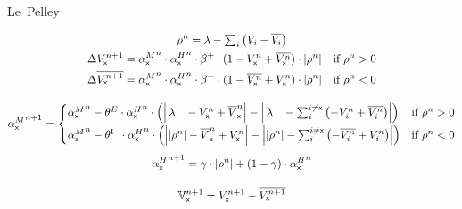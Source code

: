 \documentclass[border=10pt,varwidth=14cm]{standalone}
\begin{document}
\newcommand{\eks}{\textsf{x}}
\newcommand{\longlambda}{\rlap{$\,\lambda$}\phantom{\left| \rho^n \right|}}
\newcommand{\longI}{\rlap{\textsuperscript{I}}\phantom{E}}
\newcommand{\VNet}{\mathbb{V}}

\begin{center}
	\huge
	\sffamily
	Le~Pelley
\end{center}
\begin{gather*}
	\begin{gathered}
		\rho^n = \lambda - \textstyle\sum_i \left( V_i - \overline{V_i} \right) \\
		\begin{aligned}
			\Delta V_\eks^{n + 1} &= {\alpha^M_\eks}^n \cdot {\alpha^H_\eks}^n \cdot \beta^+ \cdot (1 - V_\eks^n + \overline{V_\eks^n}) \cdot \left| \rho^n \right| & \text{if } \rho^n > 0 \\
			 \Delta \overline{V_\eks^{n + 1}} &= {\alpha^M_\eks}^n \cdot {\alpha^H_\eks}^n \cdot \beta^- \cdot (1 - \overline{V_\eks^n} + V_\eks^n) \cdot \left| \rho^n \right| & \text{if } \rho^n < 0
		\end{aligned}
	\end{gathered} \\[1em]
	\begin{gathered}
		{\alpha^M_\eks}^{n + 1} =
			\begin{cases}
				{\alpha^M_\eks}^n - \theta^E \cdot {\alpha^H_\eks}^n \cdot \left( \left| \longlambda - V_\eks^n + \overline{V}_\eks^n \right| - \left| \longlambda - \textstyle\sum_i^{i \neq \eks} \left( - V_i^n + \overline{V_i^n} \right) \right| \right) & \text{if } \rho^n > 0 \\[1ex]
				 {\alpha^M_\eks}^n -\theta{\longI{}} \cdot {\alpha^H_\eks}^n \cdot \left( \left| \left| \rho^n \right| - \overline{V}_\eks^n + V_\eks^n \right| - \left| \left| \rho^n \right| - \textstyle\sum_i^{i \neq \eks} \left( - \overline{V_i^n} + V_i^n \right) \right| \right) & \text{if } \rho^n < 0
			\end{cases} \\[1ex]
				{\alpha^H_\eks}^{n + 1} = \gamma \cdot \left| \rho^n \right| + \left( 1 - \gamma \right) \cdot {\alpha^H_\eks}^{n}
	\end{gathered} \\[1em]
	\VNet{}_\eks^{n + 1} = V_\eks^{n + 1} - \overline{V_\eks^{n + 1}}
\end{gather*}

\nocite{lepelley}

\end{document}
